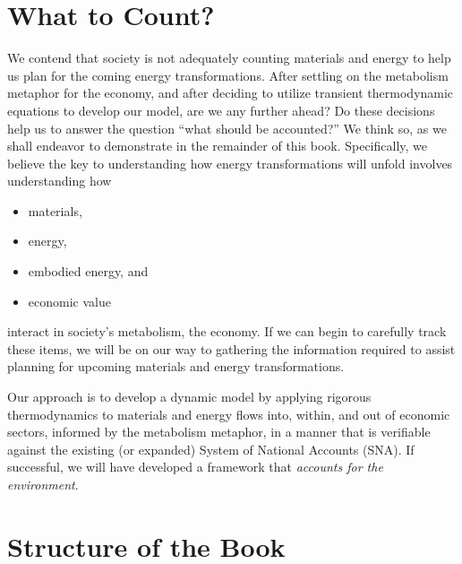 \section{What to Count?}
\label{sec:what_to_count}

We contend that society is not adequately counting materials and energy to 
help us plan for the coming energy transformations.
After settling on the metabolism metaphor for the economy, 
and after deciding to utilize transient thermodynamic equations to develop our model, 
are we any further ahead? 
Do these decisions help us to answer the question ``what should be accounted?''
We think so, as we shall endeavor to demonstrate in the remainder of this book.
Specifically, we believe the key to understanding how energy transformations will unfold
involves understanding how 

\begin{itemize}
	\item{materials,}
	\item{energy,}
	\item{embodied energy, and}
	\item{economic value}
\end{itemize}

\noindent{}interact in society's metabolism, the economy.
If we can begin to carefully track these items, 
we will be on our way to gathering the information required to 
assist planning for upcoming materials and energy transformations.

Our approach is to develop a dynamic model 
by applying rigorous thermodynamics 
to materials and energy
flows into, within, and out of economic sectors,
informed by the metabolism metaphor,
in a manner that is verifiable against 
the existing (or expanded) System of National Accounts (SNA).
If successful, we will have developed a framework 
that \emph{accounts for the environment}. 


\section{Structure of the Book}
\label{sec:structure}

